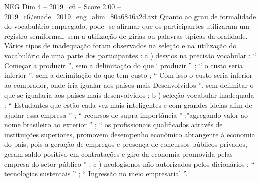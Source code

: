\begin{textsample}{NEG Dim 4 – 2019\_c6 – Score 2.00 – 2019\_c6/enade\_2019\_eng\_alim\_80a6846a2d.txt}
Quanto ao grau de formalidade do vocabulário empregado, pode -se afirmar que os participantes utilizaram um registro semiformal, sem a utilização de gírias ou palavras típicas da oralidade.
Vários tipos de inadequação foram observados na seleção e na utilização do vocabulário de uma parte dos participantes : a ) desvios na precisão vocabular : “ Começar a produzir ”, sem a delimitação do que ‘ produzir ” ; “ o custo seria inferior ”, sem a delimitação do que tem custo ; “ Com isso o custo seria inferior ao comprador, onde iria igualar aos países mais Desenvolvidos ”, sem delimitar o que se igualaria aos países mais desenvolvidos ; b ) seleção vocabular inadequada : “ Estudantes que estão cada vez mais inteligentes e com grandes ideias afim de ajudar essa empresa ” ; “ recursos de supra importância ” ;"agregando valor ao nome brasileiro ao exterior ” ; “ os profissionais qualificados através de instituições superiores, promovem desempenho econômico abrangente à economia do país, pois a geração de empregos e presença de concursos públicos privados, geram saldo positivo em contratações e giro da economia promovida pelas empresa do setor público ” ; c ) neologismos não autorizados pelos dicionários : “ tecnologias sustentais ” ; “ Ingressão no meio empresarial ”.

\end{textsample}
